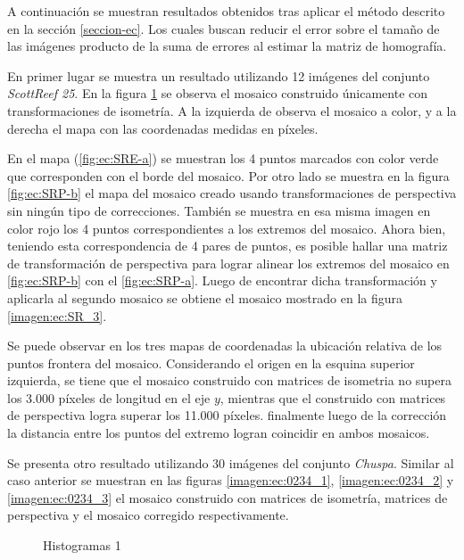 A continuación se muestran resultados obtenidos tras aplicar el método descrito en la sección \ref{seccion-ec}. Los cuales buscan reducir el error sobre el tamaño de las imágenes producto de la suma de errores al estimar la matriz de homografía. 

En primer lugar se muestra un resultado utilizando 12 imágenes del conjunto \textit{ScottReef 25}. En la figura \ref{imagen:ec:SR_1} se observa el mosaico construido únicamente con transformaciones de isometría. A la izquierda de observa el mosaico a color, y a la derecha el mapa con las coordenadas medidas en píxeles.

En el mapa (\ref{fig:ec:SRE-a}) se muestran los 4 puntos marcados con color verde que corresponden con el borde del mosaico. Por otro lado se muestra en la figura \ref{fig:ec:SRP-b} el mapa del mosaico creado usando transformaciones de perspectiva sin ningún tipo de correcciones. También se muestra en esa misma imagen en color rojo los 4 puntos correspondientes a los extremos del mosaico. Ahora bien, teniendo esta correspondencia de 4 pares de puntos, es posible hallar una matriz de transformación de perspectiva para lograr alinear los extremos del mosaico en \ref{fig:ec:SRP-b} con el \ref{fig:ec:SRP-a}. Luego de encontrar dicha transformación y aplicarla al segundo mosaico se obtiene el mosaico mostrado en la figura  \ref{imagen:ec:SR_3}.

Se puede observar en los tres mapas de coordenadas la ubicación relativa de los puntos frontera del mosaico. Considerando el origen en la esquina superior izquierda, se tiene que el mosaico construido con matrices de isometria no supera los 3.000 píxeles de longitud en el eje $y$, mientras que el construido con matrices de perspectiva logra superar los 11.000 píxeles. finalmente luego de la corrección la distancia entre los puntos del extremo logran coincidir en ambos mosaicos.


Se presenta otro resultado utilizando 30 imágenes del conjunto \textit{Chuspa}. Similar al caso anterior se muestran en las figuras \ref{imagen:ec:0234_1}, \ref{imagen:ec:0234_2} y \ref{imagen:ec:0234_3} el mosaico construido con matrices de isometría, matrices de perspectiva y el mosaico corregido respectivamente.

\begin{figure}[H]
	\centering     %
	\hspace{1mm}%
	\hspace{1mm}%
	\caption[Histogramas 1]{Histogramas 1}
	\label{imagen:ec:SR_1}
\end{figure}

